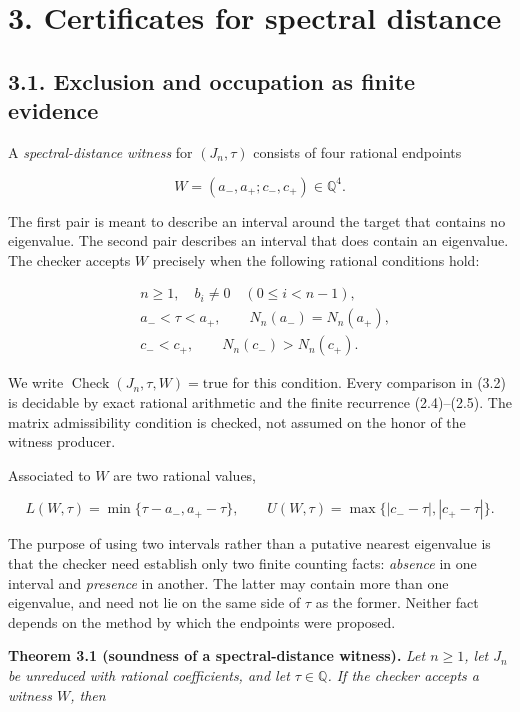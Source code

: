 \documentclass[
  11pt,
]{article}
\begin{document}
\section{3. Certificates for spectral
distance}\label{certificates-for-spectral-distance}

\subsection{3.1. Exclusion and occupation as finite
evidence}\label{exclusion-and-occupation-as-finite-evidence}

A \emph{spectral-distance witness} for \((J_n,\tau)\) consists of four
rational endpoints

\[
W=(a_-,a_+;c_-,c_+)\in\mathbb Q^4.
\tag{3.1}
\]

The first pair is meant to describe an interval around the target that
contains no eigenvalue. The second pair describes an interval that does
contain an eigenvalue. The checker accepts \(W\) precisely when the
following rational conditions hold:

\[
\begin{aligned}
&n\ge1,\quad b_i\ne0\quad(0\le i<n-1),\\
&a_-<\tau<a_+,\qquad N_n(a_-)=N_n(a_+),\\
&c_-<c_+,\qquad N_n(c_-)>N_n(c_+).
\end{aligned}
\tag{3.2}
\]

We write \(\operatorname{Check}(J_n,\tau,W)=\mathrm{true}\) for this
condition. Every comparison in (3.2) is decidable by exact rational
arithmetic and the finite recurrence (2.4)--(2.5). The matrix
admissibility condition is checked, not assumed on the honor of the
witness producer.

Associated to \(W\) are two rational values,

\[
L(W,\tau)=\min\{\tau-a_-,a_+-\tau\},
\qquad
U(W,\tau)=\max\{|c_--\tau|,|c_+-\tau|\}.
\tag{3.3}
\]

The purpose of using two intervals rather than a putative nearest
eigenvalue is that the checker need establish only two finite counting
facts: \emph{absence} in one interval and \emph{presence} in another.
The latter may contain more than one eigenvalue, and need not lie on the
same side of \(\tau\) as the former. Neither fact depends on the method
by which the endpoints were proposed.

\textbf{Theorem 3.1 (soundness of a spectral-distance witness).}
\emph{Let \(n\ge1\), let \(J_n\) be unreduced with rational
coefficients, and let \(\tau\in\mathbb Q\). If the checker accepts a
witness \(W\), then}
\end{document}
